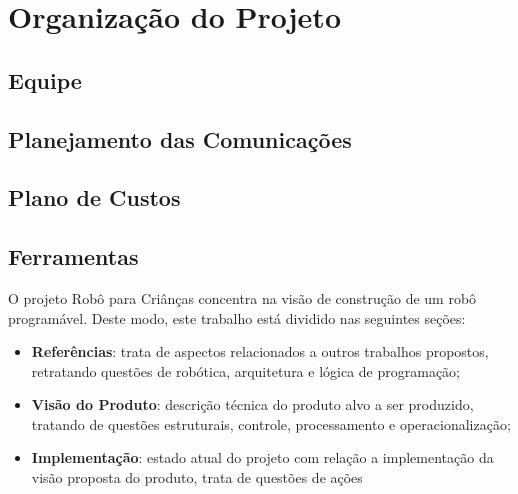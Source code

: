 \section{Organização do Projeto}
\subsection{Equipe}
\subsection{Planejamento das Comunicações}
\subsection{Plano de Custos}
\subsection{Ferramentas}
O projeto Robô para Criânças concentra na visão de construção de um robô programável. Deste modo, este trabalho está dividido nas seguintes seções:
\begin{itemize}
	\item \textbf{Referências}: trata de aspectos relacionados a outros trabalhos propostos, retratando questões de robótica, arquitetura e lógica de programação;
	\item \textbf{Visão do Produto}: descrição técnica do produto alvo a ser produzido, tratando de questões estruturais, controle, processamento e operacionalização;
	\item \textbf{Implementação}: estado atual do projeto com relação a implementação da visão proposta do produto, trata de questões de ações
\end{itemize}
